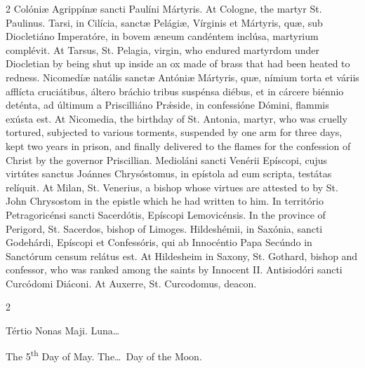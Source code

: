 \begin{paracol}{2}
\switchcolumn*
{}
Colóniæ Agrippínæ 
 sancti Paulíni Mártyris.
\switchcolumn
{}
At Cologne, the martyr St. Paulinus.
\switchcolumn*
{}
Tarsi, in Cilícia, 
 sanctæ Pelágiæ, Vírginis et Mártyris, quæ, sub Diocletiáno Imperatóre, in 
 bovem æneum candéntem inclúsa, martyrium complévit.
\switchcolumn
{}
At Tarsus, St. Pelagia, virgin, who 
 endured martyrdom under Diocletian by being shut up inside an ox made of 
 brass that had been heated to redness.
\switchcolumn*
{}
Nicomedíæ natális 
 sanctæ Antóniæ Mártyris, quæ, nímium torta et váriis afflícta cruciátibus, 
 áltero bráchio tribus suspénsa diébus, et in cárcere biénnio deténta, ad 
 últimum a Priscilliáno Prǽside, in confessióne Dómini, flammis exústa est.
\switchcolumn
{}
At Nicomedia, the birthday of St. 
 Antonia, martyr, who was cruelly tortured, subjected to various torments, 
 suspended by one arm for three days, kept two years in prison, and finally 
 delivered to the flames for the confession of Christ by the governor 
 Priscillian.
\switchcolumn*
{}
Medioláni sancti 
 Venérii Epíscopi, cujus virtútes sanctus Joánnes Chrysóstomus, in epístola 
 ad eum scripta, testátas relíquit.
\switchcolumn
{}
At Milan, St. Venerius, a bishop 
 whose virtues are attested to by St. John Chrysostom in the epistle which he 
 had written to him.
\switchcolumn*
{}
In território 
 Petragoricénsi sancti Sacerdótis, Epíscopi Lemovicénsis.
\switchcolumn
{}
In the province of Perigord, St. 
 Sacerdos, bishop of Limoges.
\switchcolumn*
{}
Hildeshémii, in 
 Saxónia, sancti Godehárdi, Epíscopi et Confessóris, qui ab Innocéntio Papa 
 Secúndo in Sanctórum censum relátus est.
\switchcolumn
{}
At Hildesheim in Saxony, St. Gothard, 
 bishop and confessor, who was ranked among the saints by Innocent II.
\switchcolumn*
{}
Antisiodóri sancti 
 Curcódomi Diáconi.
\switchcolumn
{}
At Auxerre, St. Curcodomus, deacon.
\switchcolumn*
{}
\end{paracol}


\begin{paracol}{2}
\begin{center}{\color{gregoriocolor} Tértio Nonas Maji. 
 Luna\dots\ }\end{center}
\switchcolumn
{}
\begin{center}{\color{gregoriocolor} The 
 5\textsuperscript{th} Day of May. The\dots\ Day of the Moon.}\end{center}
\end{paracol}

